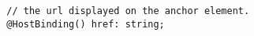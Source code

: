 \begin{verbatim}
  // the url displayed on the anchor element.
  @HostBinding() href: string;
\end{verbatim}
